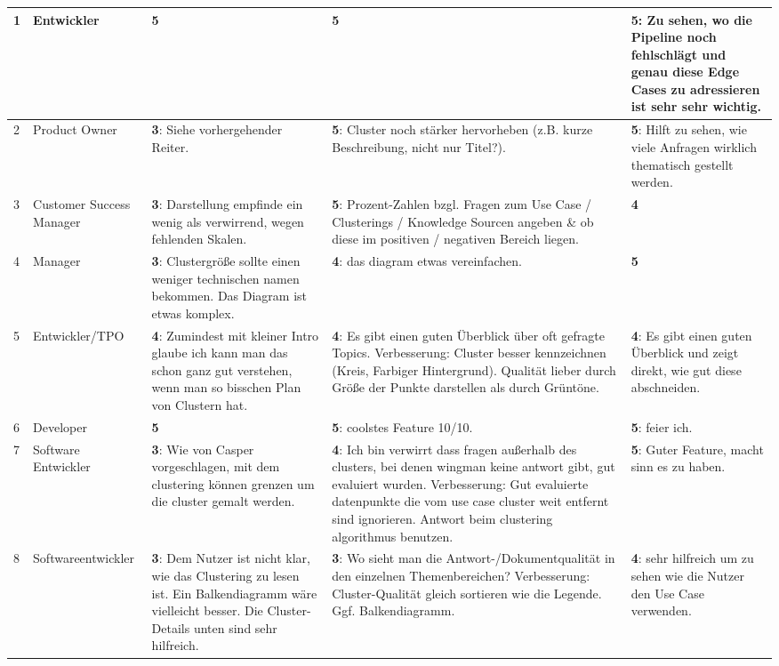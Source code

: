 \documentclass[
	english,
	ruledheaders=section,%
	class=report,%
	thesis={type=bachelor},%
	accentcolor=1b,%
	custommargins=true,%
	marginpar=false,%
	parskip=half-,%
	fontsize=11pt,%
	DIV=14,
]{tudapub}
\begin{document}
\begin{longtable}{l >{\RaggedRight}p{3cm} >{\RaggedRight}p{3.5cm} >{\RaggedRight}p{3.5cm} >{\RaggedRight}p{3.5cm}}
    1 & Entwickler & \textbf{5} & \textbf{5} & \textbf{5}: Zu sehen, wo die Pipeline noch fehlschlägt und genau diese Edge Cases zu adressieren ist sehr sehr wichtig. \\
    \midrule
    2 & Product Owner & \textbf{3}: Siehe vorhergehender Reiter. & \textbf{5}: Cluster noch stärker hervorheben (z.B. kurze Beschreibung, nicht nur Titel?). & \textbf{5}: Hilft zu sehen, wie viele Anfragen wirklich thematisch gestellt werden. \\
    \midrule
    3 & Customer Success Manager & \textbf{3}: Darstellung empfinde ein wenig als verwirrend, wegen fehlenden Skalen. & \textbf{5}: Prozent-Zahlen bzgl. Fragen zum Use Case / Clusterings / Knowledge Sourcen angeben \& ob diese im positiven / negativen Bereich liegen. & \textbf{4} \\
    \midrule
    4 & Manager & \textbf{3}: Clustergröße sollte einen weniger technischen namen bekommen. Das Diagram ist etwas komplex. & \textbf{4}: das diagram etwas vereinfachen. & \textbf{5} \\
    \midrule
    5 & Entwickler/TPO & \textbf{4}: Zumindest mit kleiner Intro glaube ich kann man das schon ganz gut verstehen, wenn man so bisschen Plan von Clustern hat. & \textbf{4}: Es gibt einen guten Überblick über oft gefragte Topics. Verbesserung: Cluster besser kennzeichnen (Kreis, Farbiger Hintergrund). Qualität lieber durch Größe der Punkte darstellen als durch Grüntöne. & \textbf{4}: Es gibt einen guten Überblick und zeigt direkt, wie gut diese abschneiden. \\
    \midrule
    6 & Developer & \textbf{5} & \textbf{5}: coolstes Feature 10/10. & \textbf{5}: feier ich. \\
    \midrule
    7 & Software Entwickler & \textbf{3}: Wie von Casper vorgeschlagen, mit dem clustering können grenzen um die cluster gemalt werden. & \textbf{4}: Ich bin verwirrt dass fragen außerhalb des clusters, bei denen wingman keine antwort gibt, gut evaluiert wurden. Verbesserung: Gut evaluierte datenpunkte die vom use case cluster weit entfernt sind ignorieren. Antwort beim clustering algorithmus benutzen. & \textbf{5}: Guter Feature, macht sinn es zu haben. \\
    \midrule
    8 & Softwareentwickler & \textbf{3}: Dem Nutzer ist nicht klar, wie das Clustering zu lesen ist. Ein Balkendiagramm wäre vielleicht besser. Die Cluster-Details unten sind sehr hilfreich. & \textbf{3}: Wo sieht man die Antwort-/Dokumentqualität in den einzelnen Themenbereichen? Verbesserung: Cluster-Qualität gleich sortieren wie die Legende. Ggf. Balkendiagramm. & \textbf{4}: sehr hilfreich um zu sehen wie die Nutzer den Use Case verwenden. \\

\end{longtable}
\end{document}
